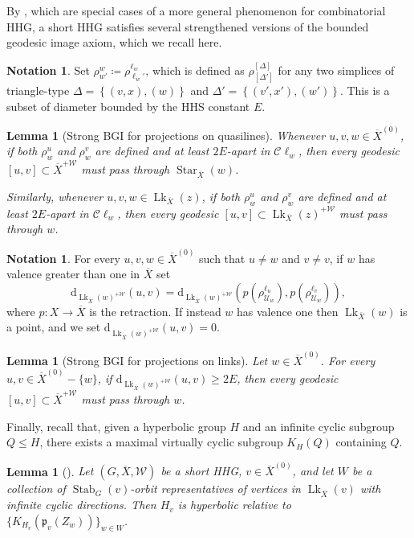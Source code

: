 \documentclass[svgnames]{amsart}
\theoremstyle{plain}
\newtheorem{lemma}[thm]{Lemma}
\theoremstyle{definition}
\newtheorem{notation}[thm]{Notation}
\newcommand{\C}{\mathcal C}
\newcommand{\ov}[1]{\overline{#1}}
\newcommand{\U}{\mathcal{U}}
\newcommand{\dist}{\mathrm{d}}
\newcommand{\link}{\operatorname{Lk}}
\newcommand{\Stab}[2]{\operatorname{Stab}_{#1}(#2)}
\newcommand{\W}{\mathcal{W}}
\newcommand{\p}{\mathfrak{p}}
\begin{document}
By \cite[Lemmas 2.10 and 2.11]{Short_HHG:I}, which are special cases of a more general phenomenon for combinatorial HHG, a short HHG satisfies several strengthened versions of the bounded geodesic image axiom, which we recall here.
\begin{notation}\label{notation:rho}
    Set $\rho^w_{w'}\coloneq \rho^{\ell_w}_{\ell_w'}$, which is defined as $\rho^{[\Delta]}_{[\Delta']}$ for any two simplices of triangle-type $\Delta=\left\{(v,x), (w)\right\}$ and $\Delta'=\left\{(v',x'), (w')\right\}$. This is a subset of diameter bounded by the HHS constant $E$. 
\end{notation}

\begin{lemma}[Strong BGI for projections on quasilines]\label{lem:strong_bgi_for_short}
    Whenever $u,v,w\in \ov X^{(0)}$, if both $\rho^u_w$ and $\rho^v_w$ are defined and at least $2E$-apart in $\C \ell_w$, then every geodesic $[u,v]\subset \ov X^{+\W}$ must pass through $\operatorname{Star}_{\ov{X}}(w)$.

    Similarly, whenever $u,v,w\in\link_{\ov{X}}(z)$, if both $\rho^u_w$ and $\rho^v_w$ are defined and at least $2E$-apart in $\C\ell_w$, then every geodesic $[u,v]\subset \link_{\ov{X}}(z)^{+\W}$ must pass through $w$.
\end{lemma}

\begin{notation}
    For every $u,v,w\in\ov X^{(0)}$ such that $u\neq w$ and $v\neq v$, if $w$ has valence greater than one in $\ov X$ set 
$$\dist_{\link_{\ov X}(w)^{+\W}}(u, v)=\dist_{\link_{\ov X}(w)^{+\W}}\left( p(\rho^{\ell_u}_{\U_w}), p(\rho^{\ell_v}_{\U_w})\right),$$
where $p\colon X\to \ov X$ is the retraction. If instead $w$ has valence one then $\link_{\ov X}(w)$ is a point, and we set $\dist_{\link_{\ov X}(w)^{+\W}}(u, v)=0$.
\end{notation}


\begin{lemma}[Strong BGI for projections on links]\label{lem:strong_bgi_for_short_edge_type}
    Let $w\in\ov X^{(0)}$. For every $u,v\in \ov X^{(0)}-\{w\}$, if $\dist_{\link_{\ov X}(w)^{+\W}}(u, v)\ge 2E$, then every geodesic $[u,v]\subset \ov X^{+\W}$ must pass through $w$.
\end{lemma}

Finally, recall that, given a hyperbolic group $H$ and an infinite cyclic subgroup $Q\le H$, there exists a maximal virtually cyclic subgroup $K_{H}(Q)$ containing $Q$.
\begin{lemma}[{\cite[Lemma 2.17]{Short_HHG:I}}]\label{lem:Hv_hyp_1}
       Let $(G, \ov X, \W)$ be a short HHG, $v\in \ov{X}^{(0)}$, and let $W$ be a collection of $\Stab{G}{v}$-orbit representatives of vertices in $\link_{\ov X}(v)$ with infinite cyclic directions. Then $H_v$ is hyperbolic relative to $\{K_{H_v}(\p_v(Z_w))\}_{w\in W}$. 
\end{lemma}
\end{document}
